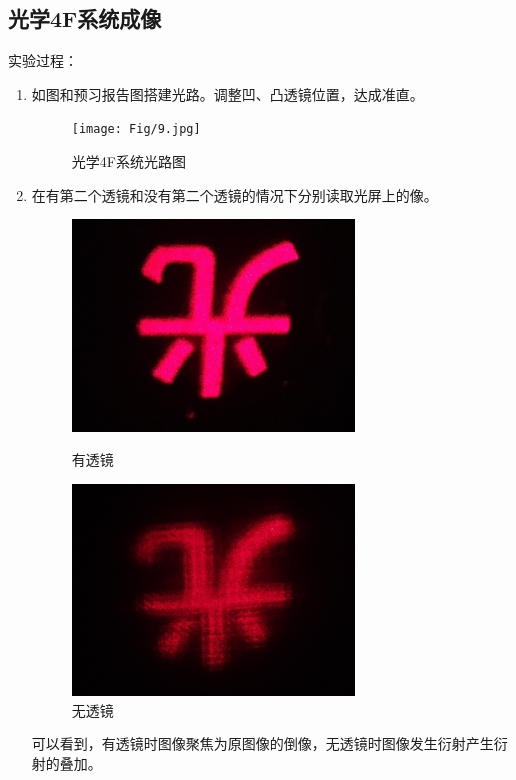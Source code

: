 \documentclass[11pt]{article}
\begin{document}
\subsection{光学4F系统成像}
\noindent 实验过程：
\begin{enumerate}
    \item 如图和预习报告图搭建光路。调整凹、凸透镜位置，达成准直。
    \begin{figure}[H]
        \centering
        \texttt{[image: Fig/9.jpg]}
        \caption{光学4F系统光路图}
    \end{figure}
    \item 在有第二个透镜和没有第二个透镜的情况下分别读取光屏上的像。
    \begin{figure}[H]
        \centering
        \begin{minipage}[t]{0.49\linewidth}
            \centering
            \includegraphics[width=7.5cm]{Fig/10-有透镜.jpg}
            \caption{有透镜}
        \end{minipage}
        \begin{minipage}[t]{0.49\linewidth}
            \centering
            \includegraphics[width=7.5cm]{Fig/10-无透镜.jpg}
            \caption{无透镜}
        \end{minipage}
    \end{figure}
    \par \hspace*{2em}可以看到，有透镜时图像聚焦为原图像的倒像，无透镜时图像发生衍射产生衍射的叠加。

\end{enumerate}
\end{document}
